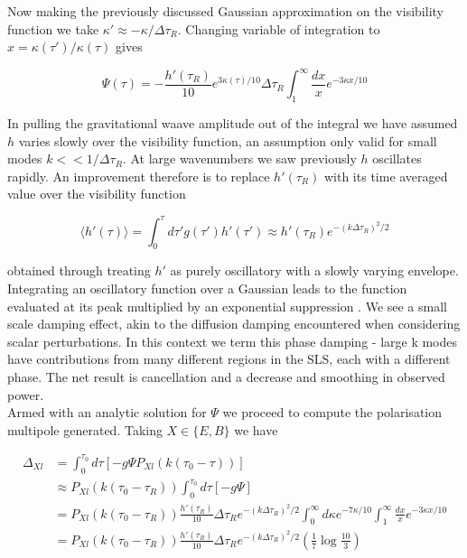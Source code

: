 \documentclass[a4paper,10pt]{article}
\begin{document}
Now making the previously discussed Gaussian approximation on the visibility function we take $\kappa'\approx -\kappa/\Delta\tau_R$. Changing variable of integration to $x=\kappa(\tau')/\kappa(\tau)$ gives

\begin{equation}
\Psi(\tau) = -\frac{h'(\tau_R)}{10}e^{3\kappa(\tau)/10}\Delta\tau_R\int_1^\infty\frac{dx}{x}e^{-3\kappa x/10}
\end{equation}

In pulling the gravitational waave amplitude out of the integral we have assumed $h$ varies slowly over the visibility function, an assumption only valid for small modes $k<<1/\Delta\tau_R$. At large wavenumbers we saw previously $h$ oscillates rapidly. An improvement therefore is to replace $h'(\tau_R)$ with its time averaged value over the visibility function

\begin{equation}
\langle h'(\tau) \rangle = \int_0^{\tau} d\tau' g(\tau')h'(\tau') \approx h'(\tau_R)e^{-(k\Delta\tau_R)^2/2}
\end{equation}

obtained through treating $h'$ as purely oscillatory with a slowly varying envelope. Integrating an oscillatory function over a Gaussian leads to the function evaluated at its peak multiplied by an exponential suppression . We see a small scale damping effect, akin to the diffusion damping encountered when considering scalar perturbations. In this context we term this phase damping - large k modes have contributions from many different regions in the SLS, each with a different phase. The net result is cancellation and a decrease and smoothing in observed power.\\

Armed with an analytic solution for $\Psi$ we proceed to compute the polarisation multipole generated. Taking $X\in\{E,B\}$ we have

\begin{equation}
\begin{split}
\Delta_{Xl} &= \int_0^{\tau_0} d\tau [-g\Psi P_{Xl}(k(\tau_0-\tau))]\\
&\approx P_{Xl}(k(\tau_0-\tau_R)) \int_0^{\tau_0} d\tau [-g\Psi] \\
&= P_{Xl}(k(\tau_0-\tau_R)) \frac{h'(\tau_R)}{10}\Delta\tau_Re^{-(k\Delta\tau_R)^2/2} \int_0^\infty d\kappa e^{-7\kappa/10} \int_1^\infty\frac{dx}{x}e^{-3\kappa x/10}\\
&=P_{Xl}(k(\tau_0-\tau_R)) \frac{h'(\tau_R)}{10}\Delta\tau_Re^{-(k\Delta\tau_R)^2/2} (\frac{1}{7}\log{\frac{10}{3}})
\end{split}
\end{equation}
\end{document}
